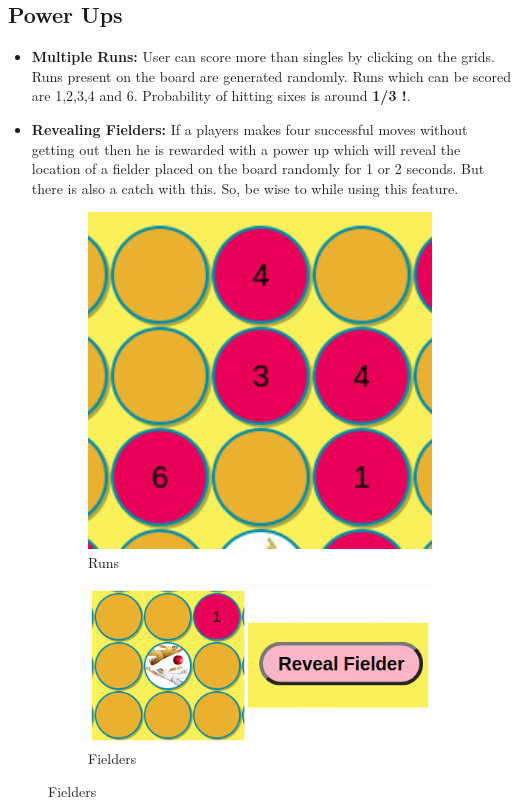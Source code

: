 \documentclass{article}
\begin{document}
\subsection{Power Ups}
\begin{itemize}
\item {\bfseries Multiple Runs:} User can score more than singles by clicking on the grids. Runs present on the board are generated randomly. Runs which can be scored are 1,2,3,4 and 6. Probability of hitting sixes is around \textbf{1/3 !}.
\item {\bfseries Revealing Fielders:} If a players makes four successful moves without getting out then he is rewarded with a power up which will reveal the location of a fielder placed on the board randomly for 1 or 2 seconds. But there is also a catch with this. So, be wise to while using this feature.
\end{itemize}
\begin{figure}[h!]
    \centering
    \begin{subfigure}[c]{0.49\textwidth}
        \centering
        \includegraphics[width=1\textwidth]{runs.png}
        \caption{Runs}
        \label{2}
    \end{subfigure}
    \hfill
    \begin{subfigure}[c]{0.49\textwidth}
        \centering
        \includegraphics[width=1\textwidth]{reveal_fielder.png}
        \caption{Fielders}
        \label{2}
    \end{subfigure}
\end{figure}
\newpage
\end{document}
